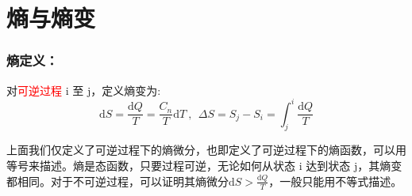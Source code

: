 \documentclass[zihao=-4,UTF8]{report}
\begin{document}
\section{熵与熵变}
\subsubsection{熵定义：}
对\textcolor{red}{可逆过程} i 至 j，定义熵变为: 
\begin{equation*}
    \mathrm{d}S = \frac{\mathrm{d}Q}{\,T\,} = \frac{C_n }{\,T\,}\mathrm{d}T\ ,\ \ \Delta S = S_j -S_i  = \int_{j}^{i}\frac{\mathrm{d}Q}{\,T\,}
\end{equation*}\par
{\par\color{gray}\small
上面我们仅定义了可逆过程下的熵微分，也即定义了可逆过程下的熵函数，可以用等号来描述。熵是态函数，只要过程可逆，无论如何从状态 i 达到状态 j，其熵变都相同。对于不可逆过程，可以证明其熵微分$\mathrm{d}S > \frac{\mathrm{d}Q}{\,T\,}$，一般只能用不等式描述。
\par}
\end{document}
